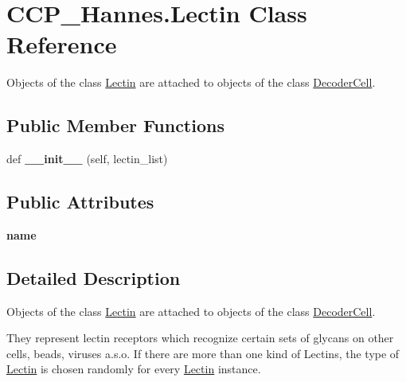 \hypertarget{class_c_c_p___hannes_1_1_lectin}{}\section{C\+C\+P\+\_\+\+Hannes.\+Lectin Class Reference}
\label{class_c_c_p___hannes_1_1_lectin}


Objects of the class \mbox{\hyperlink{class_c_c_p___hannes_1_1_lectin}{Lectin}} are attached to objects of the class \mbox{\hyperlink{class_c_c_p___hannes_1_1_decoder_cell}{Decoder\+Cell}}.  


\subsection*{Public Member Functions}
\begin{DoxyCompactItemize}
\item 
\mbox{\label{class_c_c_p___hannes_1_1_lectin_ad0b481fc5f873f2e601b5d087c0d97a4}} 
def {\bfseries \+\_\+\+\_\+init\+\_\+\+\_\+} (self, lectin\+\_\+list)
\end{DoxyCompactItemize}
\subsection*{Public Attributes}
\begin{DoxyCompactItemize}
\item 
\mbox{\label{class_c_c_p___hannes_1_1_lectin_ac681f373d9d37dfb0e66def9db71757c}} 
{\bfseries name}
\end{DoxyCompactItemize}


\subsection{Detailed Description}
Objects of the class \mbox{\hyperlink{class_c_c_p___hannes_1_1_lectin}{Lectin}} are attached to objects of the class \mbox{\hyperlink{class_c_c_p___hannes_1_1_decoder_cell}{Decoder\+Cell}}. 

They represent lectin receptors which recognize certain sets of glycans on other cells, beads, viruses a.\+s.\+o. If there are more than one kind of Lectins, the type of \mbox{\hyperlink{class_c_c_p___hannes_1_1_lectin}{Lectin}} is chosen randomly for every \mbox{\hyperlink{class_c_c_p___hannes_1_1_lectin}{Lectin}} instance.


